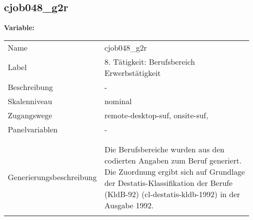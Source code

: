 	
	
	\subsection{cjob048\_g2r}
	\label{subSection:cjob048_g2r}

	\noindent\textbf{Variable:}\\
		\begin{tabular}{lL{11.3cm}}
			\label{tableVariable:cjob048_g2r}
			Name & cjob048\_g2r \\
			Label & 8. Tätigkeit: Berufsbereich Erwerbstätigkeit \\
			Beschreibung & - \\
			Skalenniveau & nominal \\
			Zugangswege &
				remote-desktop-suf,
				onsite-suf,
 \\
			Panelvariablen & -
			 \\
			 \\
 \\
					Generierungsbeschreibung & Die Berufsbereiche wurden aus den codierten Angaben zum Beruf generiert. Die Zuordnung ergibt sich auf Grundlage der Destatis-Klassifikation der Berufe (KldB-92) (cl-destatis-kldb-1992) in der Ausgabe 1992. 
				 \\	
			 \\
		\end{tabular}






